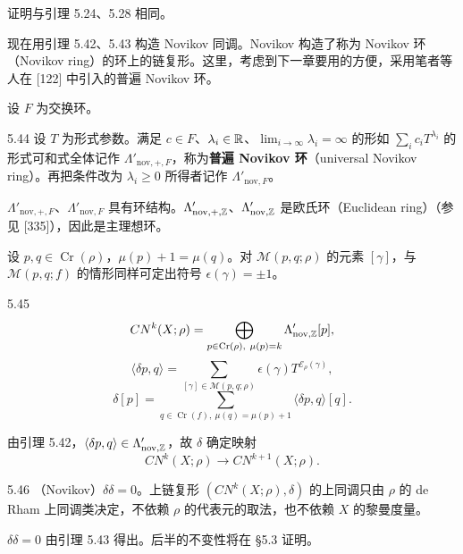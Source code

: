 证明与引理 5.24、5.28 相同。

现在用引理 5.42、5.43 构造 Novikov 同调。Novikov 构造了称为 Novikov 环（Novikov ring）的环上的链复形。这里，考虑到下一章要用的方便，采用笔者等人在 [122] 中引入的普遍 Novikov 环。

设 $F$ 为交换环。

\begin{definition}{5.44}
  设 $T$ 为形式参数。满足 $c\in F$、$\lambda_i\in\mathbb{R}$、$\lim_{i\to\infty}\lambda_i=\infty$ 的形如 $\sum_ic_iT^{\lambda_i}$ 的形式可和式全体记作 $\Lambda'_{\mathrm{nov},+,F}$，称为\textbf{普遍 Novikov 环}（universal Novikov ring）。再把条件改为 $\lambda_i\ge0$ 所得者记作 $\Lambda'_{\mathrm{nov},F}$。
\end{definition}

$\Lambda'_{\mathrm{nov},+,F}$、$\Lambda'_{\mathrm{nov},F}$ 具有环结构。$\Lambda'_{\mathrm{nov},+,\mathbb{Z}}$、$\Lambda'_{\mathrm{nov},\mathbb{Z}}$ 是欧氏环（Euclidean ring）（参见 [335]），因此是主理想环。


设 $p,q\in\operatorname{Cr}(\rho)$，$\mu(p)+1=\mu(q)$。对 $\mathcal{M}(p,q;\rho)$ 的元素 $[\gamma]$，与 $\mathcal{M}(p,q;f)$ 的情形同样可定出符号 $\epsilon(\gamma)=\pm1$。

\begin{definition}{5.45}
  \[
    CN^k(X;\rho)=\bigoplus_{p\in\operatorname{Cr}(\rho),\ \mu(p)=k}\Lambda'_{\mathrm{nov},\Z}[p],
  \]
  \[
    \langle\delta p,q\rangle=\sum_{[\gamma]\in\mathcal{M}(p,q;\rho)}\epsilon(\gamma)T^{\mathcal{E}_\rho(\gamma)},
  \]
  \[
    \delta[p]=\sum_{q\in\operatorname{Cr}(f),\ \mu(q)=\mu(p)+1}\langle\delta p,q\rangle[q].
  \]
\end{definition}

由引理 5.42，$\langle\delta p,q\rangle\in\Lambda'_{\mathrm{nov},\mathbb{Z}}$，故 $\delta$ 确定映射
\[
  CN^k(X;\rho)\to CN^{k+1}(X;\rho).
\]

\begin{theorem}{5.46}
  （Novikov）$\delta\delta=0$。上链复形 $(CN^k(X;\rho),\delta)$ 的上同调只由 $\rho$ 的 de Rham 上同调类决定，不依赖 $\rho$ 的代表元的取法，也不依赖 $X$ 的黎曼度量。
\end{theorem}

$\delta\delta=0$ 由引理 5.43 得出。后半的不变性将在 §5.3 证明。

